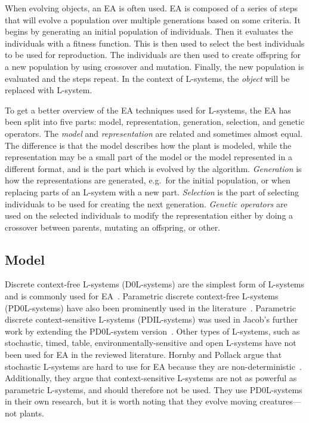 When evolving objects, an \gls{EA} is often used.
\gls{EA} is composed of a series of steps that will evolve a population over multiple generations based on some criteria.
It begins by generating an initial population of individuals.
Then it evaluates the individuals with a fitness function.
This is then used to select the best individuals to be used for reproduction.
The individuals are then used to create offspring for a new population by using crossover and mutation.
Finally, the new population is evaluated and the steps repeat.
In the context of \glspl{L-system}, the \textit{object} will be replaced with \gls{L-system}.

To get a better overview of the \gls{EA} techniques used for \glspl{L-system}, the \gls{EA} has been split into five parts: model, representation, generation, selection, and genetic operators.
The \textit{model} and \textit{representation} are related and sometimes almost equal.
The difference is that the model describes how the plant is modeled, while the representation may be a small part of the model or the model represented in a different format, and is the part which is evolved by the algorithm.
\textit{Generation} is how the representations are generated, e.g.\ for the initial population, or when replacing parts of an \gls{L-system} with a new part.
\textit{Selection} is the part of selecting individuals to be used for creating the next generation.
\textit{Genetic operators} are used on the selected individuals to modify the representation either by doing a crossover between parents, mutating an offspring, or other.

\subsection{Model}
Discrete context-free \glspl{L-system} (D0L-systems) are the simplest form of \glspl{L-system} and is commonly used for \gls{EA}~\cite{1998Mock,1998Ochoa,2002Ebner,2003Ebner,2006Ashlock,2009Beaumont,2009Corchado}.
Parametric discrete context-free \glspl{L-system} (PD0L-systems) have also been prominently used in the literature~\cite{1994Jacob,2000Vanak,2001Hornby}.
Parametric discrete context-sensitive \glspl{L-system} (PDIL-systems) was used in Jacob's further work by extending the PD0L-system version~\cite{1995Jacob, 1996Jacob, 1996Jacob-2}.
Other types of \glspl{L-system}, such as stochastic, timed, table, environmentally-sensitive and open \glspl{L-system} have not been used for \gls{EA} in the reviewed literature.
Hornby and Pollack argue that stochastic \glspl{L-system} are hard to use for \gls{EA} because they are non-deterministic~\cite{2001Hornby}.
Additionally, they argue that context-sensitive \glspl{L-system} are not as powerful as parametric \glspl{L-system}, and should therefore not be used.
They use PD0L-systems in their own research, but it is worth noting that they evolve moving creatures---not plants.


